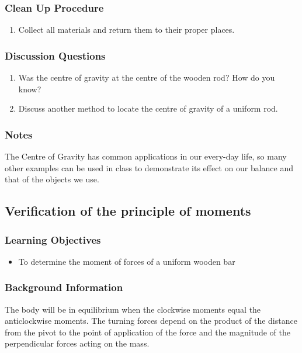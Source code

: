 \subsubsection*{Clean Up Procedure}
\begin{enumerate}
\item{Collect all materials and return them to their proper places.} 
\end{enumerate}

\subsubsection*{Discussion Questions}
\begin{enumerate}
\item{Was the centre of gravity at the centre of the wooden rod? How do you know?}
\item{Discuss another method to locate the centre of gravity of a uniform rod.} 
\end{enumerate}

\subsubsection*{Notes}
The Centre of Gravity has common applications in our every-day life, so many other examples can be used in class to demonstrate its effect on our balance and that of the objects we use.  


\subsection{Verification of the principle of moments}

\subsubsection*{Learning Objectives}
\begin{itemize}
\item{To determine the moment of forces of a uniform wooden bar}
\end{itemize}

\subsubsection*{Background Information}
The body will be in equilibrium when the clockwise moments equal the anticlockwise moments. The turning forces depend on the product of the distance from the pivot to the point of application of the force and the magnitude of the perpendicular forces acting on the mass.  

